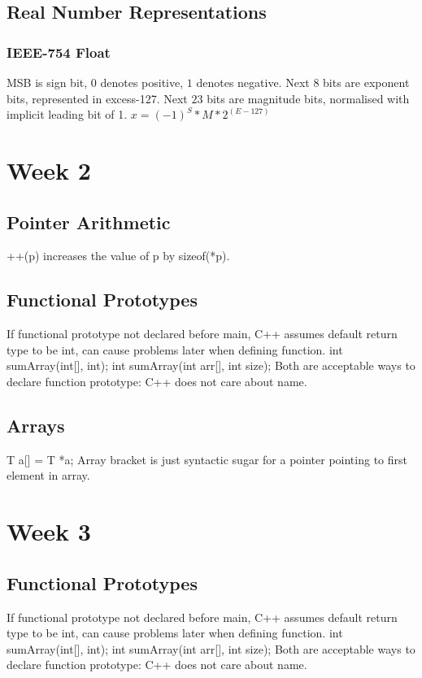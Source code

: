 \documentclass{article}
\begin{document}
\begin{multicols*}{3}
\subsection{Real Number Representations}
\subsubsection{IEEE-754 Float}
MSB is sign bit, $0$ denotes positive, $1$ denotes negative.
Next $8$ bits are exponent bits, represented in excess-127.
Next $23$ bits are magnitude bits, normalised with implicit leading bit of 1.
$x = (-1)^{S}*M*2^{(E-127)}$
\section{Week 2}
\subsection{Pointer Arithmetic}
++(p) increases the value of p by sizeof(*p).
\subsection{Functional Prototypes}
If functional prototype not declared before main, C++ assumes default return type to be int, can cause problems later when defining function.
\newline
int sumArray(int[], int);
\newline
int sumArray(int arr[], int size);
\newline
Both are acceptable ways to declare function prototype: C++ does not care about name.
\newline
\subsection{Arrays}
T a[] = T *a;
Array bracket is just syntactic sugar for a pointer pointing to first element in array.

\section{Week 3}
\subsection{Functional Prototypes}
If functional prototype not declared before main, C++ assumes default return type to be int, can cause problems later when defining function.
\newline
int sumArray(int[], int);
\newline
int sumArray(int arr[], int size);
\newline
Both are acceptable ways to declare function prototype: C++ does not care about name.
\newline

\end{multicols*}
\end{document}
